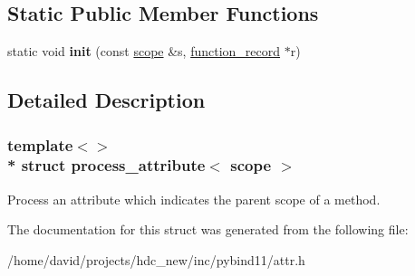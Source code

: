 \subsection*{Static Public Member Functions}
\begin{DoxyCompactItemize}
\item 
static void {\bfseries init} (const \hyperlink{structscope}{scope} \&s, \hyperlink{structfunction__record}{function\+\_\+record} $\ast$r)\hypertarget{structprocess__attribute_3_01scope_01_4_ae4a63c947913d6a637f865a2801ed778}{}\label{structprocess__attribute_3_01scope_01_4_ae4a63c947913d6a637f865a2801ed778}

\end{DoxyCompactItemize}


\subsection{Detailed Description}
\subsubsection*{template$<$$>$\\*
struct process\+\_\+attribute$<$ scope $>$}

Process an attribute which indicates the parent scope of a method. 

The documentation for this struct was generated from the following file\+:\begin{DoxyCompactItemize}
\item 
/home/david/projects/hdc\+\_\+new/inc/pybind11/attr.\+h\end{DoxyCompactItemize}

